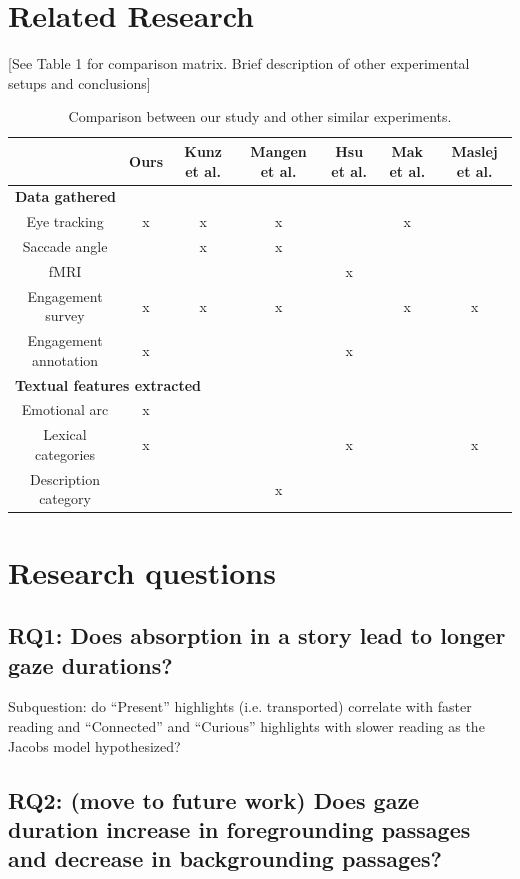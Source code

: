 \documentclass[11pt]{article}
\begin{document}
\section{Related Research}

[See Table 1 for comparison matrix. Brief description of other experimental setups and conclusions]

\begin{table}[t]
\centering
\begin{tabular}{|c|c|c|c|c|c|c|}
\hline
& \textbf{Ours} & \textbf{Kunz et al.} & \textbf{Mangen et al.} & \textbf{Hsu et al.} & \textbf{Mak et al.} & \textbf{Maslej et al.} \\
\hline
\multicolumn{7}{|l|}{\textbf{Data gathered}}\\\hline
Eye tracking & x & x & x &  & x &  \\\hline
Saccade angle &  & x & x &  &  & \\\hline
fMRI &  &  &  & x &  & \\\hline
Engagement survey & x & x & x &  & x & x\\\hline
Engagement annotation & x &  &  & x &  & \\\hline
\multicolumn{7}{|l|}{\textbf{Textual features extracted}}\\\hline
Emotional arc & x &  &  &  &  & \\\hline
Lexical categories & x &  &  & x &  & x\\\hline
Description category &  &  & x &  &  & \\\hline

\end{tabular}
\caption{Comparison between our study and other similar experiments.}
\label{tab:accents}
\end{table}

\section{Research questions}

\subsection{RQ1: Does absorption in a story lead to longer gaze durations?}

Subquestion: do “Present” highlights (i.e. transported) correlate with faster reading and “Connected” and “Curious” highlights with slower reading as the Jacobs model hypothesized?

\subsection{RQ2: (move to future work) Does gaze duration increase in foregrounding passages and decrease in backgrounding passages?}
\end{document}
